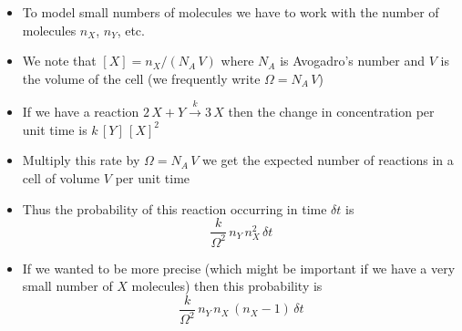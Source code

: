 \documentclass[11pt]{article}
\newcommand{\goesto}[1]{\stackrel{#1}{\longrightarrow}}
\begin{document}
\begin{itemize}
\begin{itemize}
\item Note that \(k\) is defined to absorb the combinatorial function \(\tfrac{1}{2}\)
\item The rate will depend on how close together the molecules have
to be for a reaction to occur (i.e. on \(\delta V\))
\item There will be other factors such as the orientation of the
molecules and the relative velocity of the molecules
\item From a chemical point of view, \(k\), would measure the reaction
rate per litre if all the reactants were 1 molar solutions (1
moles of \(X\) and \(Y\) per litre (dm\(^{3}\)))
\end{itemize}
\item To model small numbers of molecules we have to work with the
number of molecules \(n_X\), \(n_Y\), etc.
\item We note that \([X] = n_X/(N_A\,V)\) where \(N_A\) is Avogadro's
number and \(V\) is the volume of the cell (we frequently write
\(\Omega = N_A\,V\))
\item If we have a reaction \(2\,X + Y \goesto{k} 3\, X\)
then the change in concentration per unit time is \(k\, [Y]\,[X]^2\)
\item Multiply this rate by \(\Omega = N_A\,V\) we get the expected number of
reactions in a cell of volume \(V\) per unit time
\item Thus the probability of this reaction occurring in time \(\delta t\) is
\[ \frac{k}{\Omega^2} \, n_Y \, n_X^2 \, \delta t \]
\item If we wanted to be more precise (which might be important if we
have a very small number of \(X\) molecules) then this probability
is
 \[ \frac{k}{\Omega^2} \, n_Y \, n_X\,(n_X-1)\, \delta t \]
\end{itemize}
\end{document}
